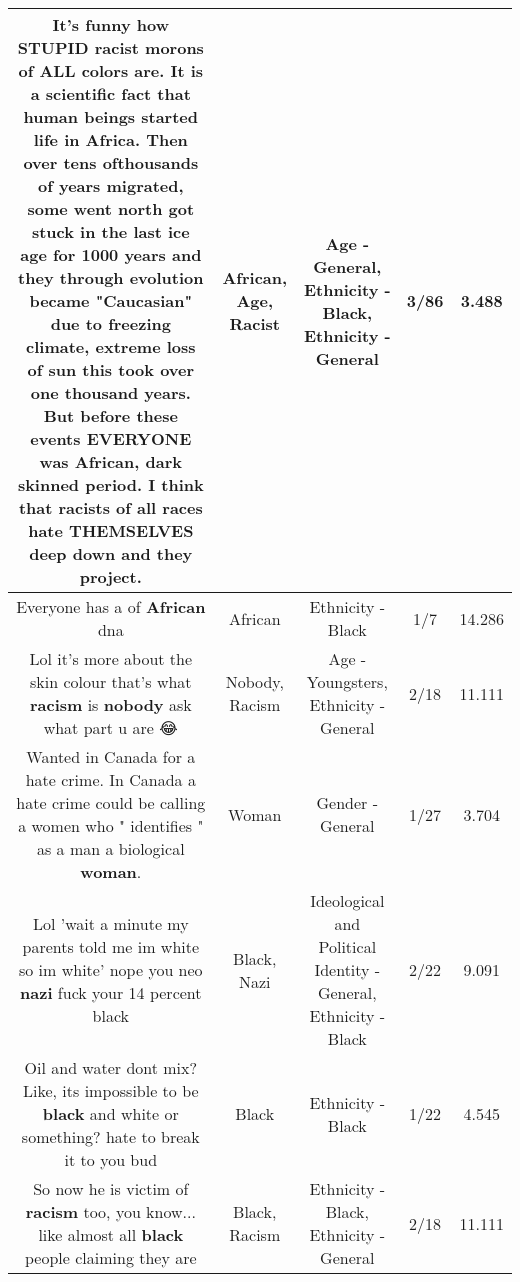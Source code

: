 \documentclass[11pt]{article}
\newlength\mylength
\begin{document}
\begin{center}
\begin{longtable}{|C{.65\mylength}|C{.30\mylength}|C{.12\mylength}|C{.12\mylength}|C{.12\mylength}|}
  \small It's funny how STUPID \textbf{racist} morons of ALL colors are. It is a scientific fact that human beings started life in Africa. Then over  tens ofthousands of years migrated, some went north got stuck in the last ice \textbf{age} for 1000 years  and they through evolution became "Caucasian" due to freezing climate, extreme loss of sun this took over one thousand years. But before these events EVERYONE was \textbf{African}, dark skinned period. I think that racists of all races hate THEMSELVES deep down and they project.\normalsize   & African, Age, Racist & Age - General, Ethnicity - Black, Ethnicity - General & 3/86 & 3.488 \\  \hline
  \small Everyone has a  of \textbf{African} dna\normalsize   & African & Ethnicity - Black & 1/7 & 14.286 \\  \hline
  \small Lol it's more about the skin colour that's what \textbf{racism} is \textbf{nobody} ask what part u are 😂\normalsize   & Nobody, Racism & Age - Youngsters, Ethnicity - General & 2/18 & 11.111 \\  \hline
  \small Wanted in Canada for a hate crime. In Canada a hate crime could be calling a women who  " identifies " as a man a biological \textbf{woman}.\normalsize   & Woman & Gender - General & 1/27 & 3.704 \\  \hline
  \small Lol 'wait a minute my parents told me im white so im white' nope you neo \textbf{nazi} fuck your 14 percent black\normalsize   & Black, Nazi &  Ideological and Political Identity - General, Ethnicity - Black & 2/22 & 9.091 \\  \hline
  \small Oil and water dont mix? Like, its impossible to be \textbf{black} and white or something? hate to break it to you bud\normalsize   & Black & Ethnicity - Black & 1/22 & 4.545 \\  \hline
  \small So now he is victim of \textbf{racism} too, you know... like almost all \textbf{black} people claiming they are\normalsize   & Black, Racism & Ethnicity - Black, Ethnicity - General & 2/18 & 11.111 \\  \hline

\end{longtable}
\end{center}
\end{document}

